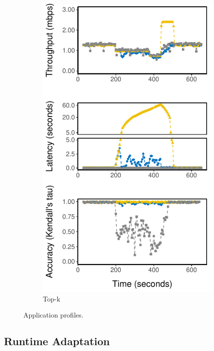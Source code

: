 \begin{figure}
\begin{subfigure}{0.33\textwidth}
    \includegraphics[width=\textwidth]{figures/runtime-topk-verticle.pdf}
    \caption{Top-k}
    \label{fig:tk-runtime}
  \end{subfigure}
  \caption{Application profiles.}
  \label{fig:all-runtime}
\end{figure}

\newpage

\subsection{Runtime Adaptation}
\label{sec:runtime-adaptation}

